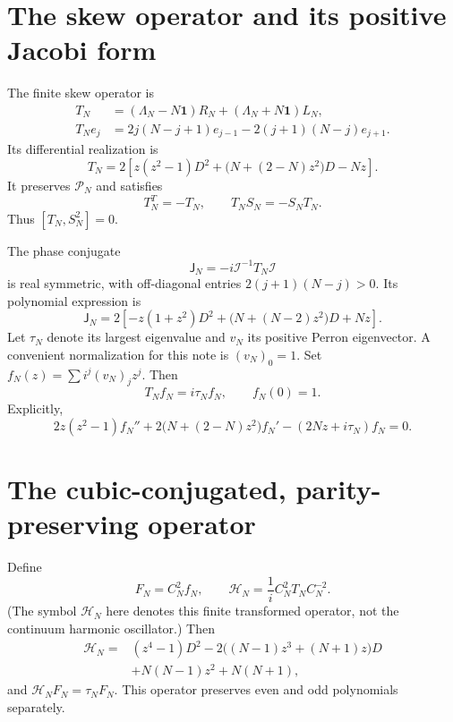 \documentclass[11pt]{article}
\newcommand{\Id}{\mathbf 1}
\newcommand{\cI}{\mathcal I}
\newcommand{\Poly}{\mathcal P}
\begin{document}
\section{The skew operator and its positive Jacobi form}
The finite skew operator is
\begin{align}
 T_N&=(\Lambda_N-N\Id)R_N+(\Lambda_N+N\Id)L_N,\\
 T_Ne_j&=2j(N-j+1)e_{j-1}-2(j+1)(N-j)e_{j+1}.
\end{align}
Its differential realization is
\begin{equation}\label{eq:T}
 \boxed{T_N=2\left[z(z^2-1)D^2+
 \bigl(N+(2-N)z^2\bigr)D-Nz\right].}
\end{equation}
It preserves $\Poly_N$ and satisfies
\[
 T_N^T=-T_N,\qquad T_NS_N=-S_NT_N.
\]
Thus $[T_N,S_N^2]=0$.

The phase conjugate
\begin{equation}\label{eq:J}
 \mathsf J_N=-i\cI^{-1}T_N\cI
\end{equation}
is real symmetric, with off-diagonal entries
$2(j+1)(N-j)>0$. Its polynomial expression is
\begin{equation}
 \mathsf J_N=2\left[-z(1+z^2)D^2+
 \bigl(N+(N-2)z^2\bigr)D+Nz\right].
\end{equation}
Let $\tau_N$ denote its largest eigenvalue and $v_N$ its positive
Perron eigenvector. A convenient normalization for this note is
$(v_N)_0=1$. Set $f_N(z)=\sum i^j(v_N)_jz^j$.
Then
\begin{equation}\label{eq:f-eig}
 T_Nf_N=i\tau_Nf_N,\qquad f_N(0)=1.
\end{equation}
Explicitly,
\[
 2z(z^2-1)f_N''+2\bigl(N+(2-N)z^2\bigr)f_N'
 -(2Nz+i\tau_N)f_N=0.
\]

\section{The cubic-conjugated, parity-preserving operator}
Define
\[
 F_N=C_N^2f_N,\qquad
 \mathscr H_N=\frac1iC_N^2T_NC_N^{-2}.
\]
(The symbol $\mathscr H_N$ here denotes this finite transformed operator,
not the continuum harmonic oscillator.) Then
\begin{equation}\label{eq:H}
 \boxed{\begin{aligned}
 \mathscr H_N={}&(z^4-1)D^2
 -2\bigl((N-1)z^3+(N+1)z\bigr)D\\
 &+N(N-1)z^2+N(N+1),
 \end{aligned}}
\end{equation}
and $\mathscr H_NF_N=\tau_NF_N$.
This operator preserves even and odd polynomials separately.
\end{document}
